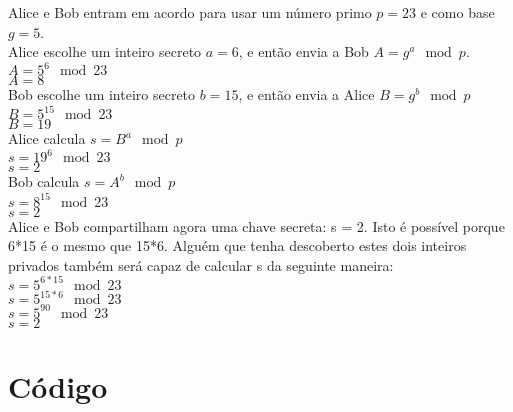 \documentclass[a4paper,11pt]{article}
\theoremstyle{mytheor}
\begin{document}
    Alice e Bob entram em acordo para usar um número primo $p=23$ e como base $g=5$.\\
    Alice escolhe um inteiro secreto $a=6$, e então envia a Bob $A = g^a \mod p$.\\
        $A = 5^6 \mod 23$\\
        $A = 8$\\
    Bob escolhe um inteiro secreto $b=15$, e então envia a Alice $B = g^b \mod p$\\
        $B = 5^{15} \mod 23$\\
        $B = 19$\\
    Alice calcula $s = B^a \mod p$\\
        $s = 19^6 \mod 23$\\
        $s = 2$\\
    Bob calcula $s = A^b \mod p$\\
        $s = 8^{15} \mod 23$\\
        $s = 2$\\

    Alice e Bob compartilham agora uma chave secreta: s = 2. Isto é possível porque 6*15 é o mesmo que 15*6. Alguém que tenha descoberto estes dois inteiros privados também será capaz de calcular s da seguinte maneira:\\
        $s = 5^{6*15} \mod 23$\\
        $s = 5^{15*6} \mod 23$\\
        $s = 5^{90} \mod 23$\\
        $s = 2$\\

\clearpage
\section*{Código}
\end{document}
